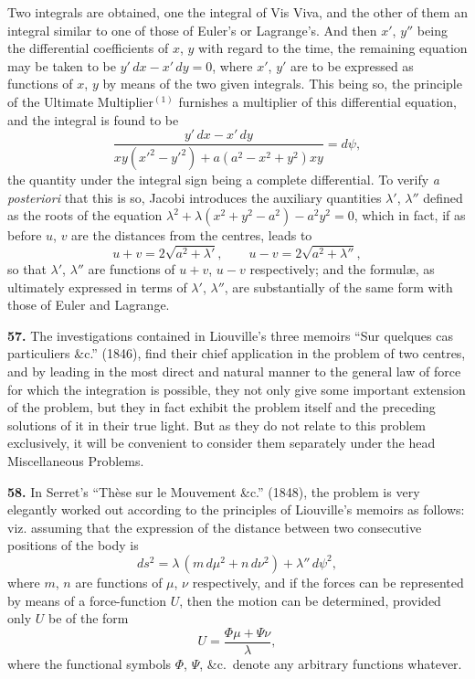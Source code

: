 \documentclass[11pt,a4paper]{book}
\begin{document}
Two integrals are obtained, one the integral of Vis Viva, and the other of them an integral similar to one of those of Euler's or Lagrange's. And then $x'$, $y''$ being the differential coefficients of $x$, $y$ with regard to the time, the remaining equation may be taken to be $y'\,dx - x'\,dy = 0$, where $x'$, $y'$ are to be expressed as functions of $x$, $y$ by means of the two given integrals. This being so, the principle of the Ultimate Multiplier$^{(1)}$ furnishes a multiplier of this differential equation, and the integral is found to be
\[
\frac{y'\,dx - x'\,dy}{xy(x'^2 - y'^2) + a(a^2 - x^2 + y^2)xy} = d\psi,
\]
the quantity under the integral sign being a complete differential. To verify \textit{a posteriori} that this is so, Jacobi introduces the auxiliary quantities $\lambda'$, $\lambda''$ defined as the roots of the equation $\lambda^2 + \lambda(x^2 + y^2 - a^2) - a^2y^2 = 0$, which in fact, if as before $u$, $v$ are the distances from the centres, leads to
\[
u + v = 2\sqrt{a^2 + \lambda'}, \qquad u - v = 2\sqrt{a^2 + \lambda''},
\]
so that $\lambda'$, $\lambda''$ are functions of $u+v$, $u-v$ respectively; and the formul\ae, as ultimately expressed in terms of $\lambda'$, $\lambda''$, are substantially of the same form with those of Euler and Lagrange.


\textbf{57.} The investigations contained in Liouville's three memoirs ``Sur quelques cas particuliers \&c.'' (1846), find their chief application in the problem of two centres, and by leading in the most direct and natural manner to the general law of force for which the integration is possible, they not only give some important extension of the problem, but they in fact exhibit the problem itself and the preceding solutions of it in their true light. But as they do not relate to this problem exclusively, it will be convenient to consider them separately under the head Miscellaneous Problems.

\textbf{58.} In Serret's ``Th\`ese sur le Mouvement \&c.'' (1848), the problem is very elegantly worked out according to the principles of Liouville's memoirs as follows: viz. assuming that the expression of the distance between two consecutive positions of the body is
\[
ds^2 = \lambda\,(m\,d\mu^2 + n\,d\nu^2) + \lambda''\,d\psi^2,
\]
where $m$, $n$ are functions of $\mu$, $\nu$ respectively, and if the forces can be represented by means of a force-function $U$, then the motion can be determined, provided only $U$ be of the form
\[
U = \frac{\Phi\mu + \Psi\nu}{\lambda},
\]
where the functional symbols $\Phi$, $\Psi$, \&c.\ denote any arbitrary functions whatever.
\end{document}
